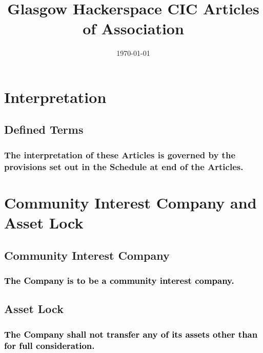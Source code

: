 \documentclass[12pt]{article}
\title{Glasgow Hackerspace CIC Articles of Association}
\date{\today}
\def\fakecolour{black}
\begin{document}
\renewcommand\contentsname{
    \centering\bfseries\Large{Index to the Articles}\justifying
}

\maketitle
\newpage
\tableofcontents
\newpage

\vspace{1.5\baselineskip}\section*{Interpretation}

\subsection{Defined Terms}
\subsubsection[General interpretation of Articles]{The interpretation of these Articles is governed by the provisions set out in the Schedule at end of the Articles.}

\vspace{1.5\baselineskip}\section*{Community Interest Company and Asset Lock}

\subsection{Community Interest Company}
\subsubsection[Community Interest Company]{\textcolor{\fakecolour}{The Company is to be a community interest company.}}
\subsection{Asset Lock}
  \subsubsection[Full Consideration of Assets]{\textcolor{\fakecolour}{The Company shall not transfer any of its assets other than for full consideration.}}\label{subsubsubsection:fullconsideration}
\end{document}
